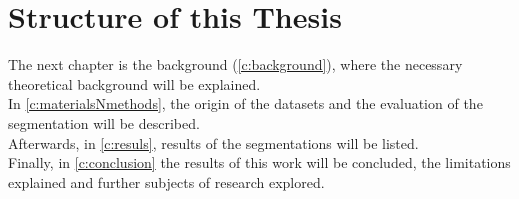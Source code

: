 \section{Structure of this Thesis}\label{s:introduction-structureofthisthesis}
The next chapter is the background (\cref{c:background}), where the necessary theoretical background will be explained.\\
In \cref{c:materialsNmethods}, the origin of the datasets and the evaluation of the segmentation will be described.\\
Afterwards, in \cref{c:resuls}, results of the segmentations will be listed.\\
Finally, in \cref{c:conclusion} the results of this work will be concluded,
the limitations explained and further subjects of research explored.
